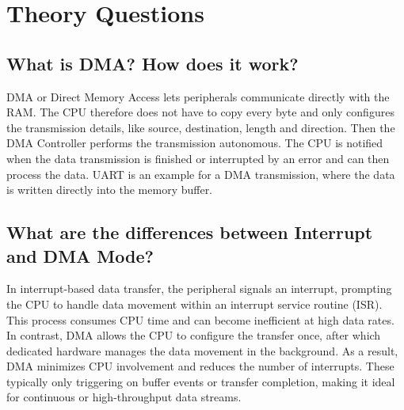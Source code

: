 \section{Theory Questions}

\subsection{What is DMA? How does it work?}
DMA or Direct Memory Access lets peripherals communicate directly with the RAM. 
The CPU therefore does not have to copy every byte and only configures the transmission details, like source, destination, length and direction.
Then the DMA Controller performs the transmission autonomous.
The CPU is notified when the data transmission is finished or interrupted by an error and can then process the data. UART is an example for a DMA transmission, where the data is written directly into the memory buffer.


\subsection{What are the differences between Interrupt and DMA Mode?}
In interrupt-based data transfer, the peripheral signals an interrupt, prompting the CPU to handle data movement within an interrupt service routine (ISR). 
This process consumes CPU time and can become inefficient at high data rates. 
In contrast, DMA allows the CPU to configure the transfer once, after which dedicated hardware manages the data movement in the background. As a result, DMA minimizes CPU involvement and reduces the number of interrupts. These typically only triggering on buffer events or transfer completion, making it ideal for continuous or high-throughput data streams.